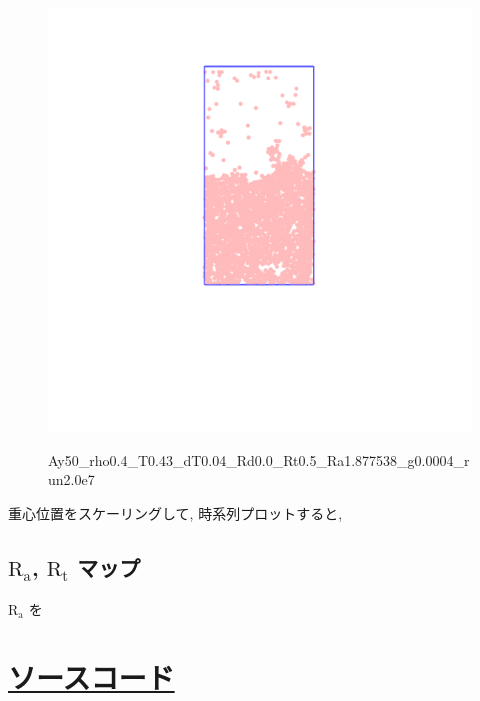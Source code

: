 \documentclass[dvipdfmx]{jsarticle}
\numberwithin{equation}{subsection}
\begin{document}
\begin{figure}[H]
  \centering
  \href{https://youtu.be/fxn1mU1ZZFQ}{\includegraphics[scale=0.4]{image/2023-11-13T17:41:52.785__chi1.265_Ay50_rho0.4_T0.43_dT0.04_Rd0.0_Rt0.5_Ra1.877538_g0.0003999718779659611_run2.0e7_output.png}}
  \caption{Ay50\_rho0.4\_T0.43\_dT0.04\_Rd0.0\_Rt0.5\_Ra1.877538\_g0.0004\_run2.0e7}
\end{figure}

重心位置をスケーリングして, 時系列プロットすると,



\subsection{$\text{R}_\text{a}$, $\text{R}_\text{t}$ マップ}

$\text{R}_\text{a}$ を~\cite{本}



\appendix
\section{\href{https://github.com/m-agnet/Report.git}{ソースコード}}







\end{document}

